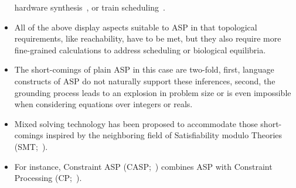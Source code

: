 \begin{itemize}
   hardware synthesis~\cite{newascha18b},
   or train scheduling~\cite{abjoossctowa19a}.
  \item
   All of the above display aspects suitable to ASP in that topological requirements, like reachability, have to be met,
   but they also require more fine-grained calculations to address scheduling or biological equilibria.
  \item
   The short-comings of plain ASP in this case are two-fold,
   first, language constructs of ASP do not naturally support these inferences,
   second, the grounding process leads to an explosion in problem size or is even impossible when considering equations over integers or reals.
  \item
   Mixed solving technology has been proposed to accommodate those short-comings inspired by the neighboring field of Satisfiability modulo Theories (SMT;~\cite{niolti06a}).
  \item
   For instance, Constraint ASP (CASP;~\cite{lierler14a}) combines ASP with Constraint Processing (CP;~\cite{dechter03a}).
\end{itemize}

